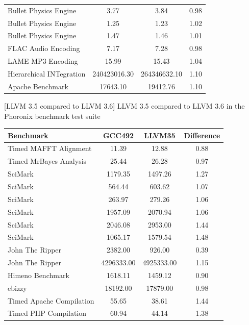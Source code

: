 \begin{appendix}
\begin{table}[htbp]
\begin{longtable}{l|c|c|c}
        Bullet Physics Engine & 3.77 & 3.84 & 0.98 \\
        Bullet Physics Engine & 1.25 & 1.23 & 1.02 \\
        Bullet Physics Engine & 1.47 & 1.46 & 1.01 \\
        FLAC Audio Encoding & 7.17 & 7.28 & 0.98 \\
        LAME MP3 Encoding & 15.99 & 15.43 & 1.04 \\
        Hierarchical INTegration & 240423016.30 & 264346632.10 & 1.10 \\
        Apache Benchmark & 17643.10 & 19412.76 & 1.10 \\
        \hline
    \end{longtable}
    [\ac{LLVM} 3.5 compared to \ac{LLVM} 3.6]{
        \ac{LLVM} 3.5 compared to \ac{LLVM} 3.6 in the Phoronix benchmark test suite\cite{LLVM35vsLLVM36}
        }
    \label{table:llvm35vsllvm36}
\end{table}
\begin{table}[htbp]
    \centering
    \begin{longtable}{l|c|c|c}
        \hline
        Benchmark & GCC492 & LLVM35 & Difference \\
        \hline
        Timed MAFFT Alignment & 11.39 & 12.88 & 0.88 \\
        Timed MrBayes Analysis & 25.44 & 26.28 & 0.97 \\
        SciMark & 1179.35 & 1497.26 & 1.27 \\
        SciMark & 564.44 & 603.62 & 1.07 \\
        SciMark & 263.97 & 279.26 & 1.06 \\
        SciMark & 1957.09 & 2070.94 & 1.06 \\
        SciMark & 2046.08 & 2953.00 & 1.44 \\
        SciMark & 1065.17 & 1579.54 & 1.48 \\
        John The Ripper & 2382.00 & 926.00 & 0.39 \\
        John The Ripper & 4296333.00 & 4925333.00 & 1.15 \\
        Himeno Benchmark & 1618.11 & 1459.12 & 0.90 \\
        ebizzy & 18192.00 & 17879.00 & 0.98 \\
        Timed Apache Compilation & 55.65 & 38.61 & 1.44 \\
        Timed PHP Compilation & 60.94 & 44.14 & 1.38 \\

\end{longtable}
\end{table}
\end{appendix}
